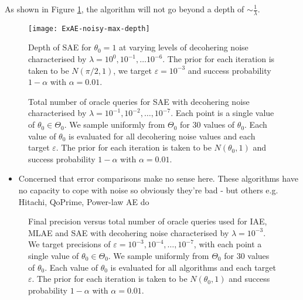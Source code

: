 As shown in Figure \ref{fig::ExAE-noisy-max-depth}, the algorithm will not go beyond a depth of $\sim \frac{1}{\lambda}$.

\begin{figure}[htbp]
	\centering
	\texttt{[image: ExAE-noisy-max-depth]}
	\caption{Depth of SAE for $\theta_0 = 1$ at varying levels of decohering noise characterised by $\lambda = 10^0, 10^{-1}, \ldots 10^{-6}$. The prior for each iteration is taken to be $N(\pi /2, 1)$, we target $\varepsilon = 10^{-3}$ and success probability $1 - \alpha$ with $\alpha = 0.01$.}
	\label{fig::ExAE-noisy-max-depth}
\end{figure}

\begin{figure}[htbp]
	\centering
	\missingfigure{}
	\caption{Total number of oracle queries for SAE with decohering noise characterised by $\lambda = 10^{-1}, 10^{-2}, \ldots, 10^{-7}$. Each point is a single value of $\theta_0 \in \Theta_0$. We sample uniformly from $\Theta_0$ for 30 values of $\theta_0$. Each value of $\theta_0$ is evaluated for all decohering noise values and each target $\varepsilon$. The prior for each iteration is taken to be $N(\theta_0, 1)$ and success probability $1 - \alpha$ with $\alpha = 0.01$.}
	\label{fig::query-exae-noisy}
\end{figure}

\begin{itemize}
	\color{red}
	\item Concerned that error comparisons make no sense here. These algorithms have no capacity to cope with noise so obviously they're bad - but others e.g. Hitachi, QoPrime, Power-law AE do
\end{itemize}

\begin{figure}[htbp]
	\centering
	\missingfigure{}
	\caption{Final precision versus total number of oracle queries used for IAE, MLAE and SAE with decohering noise characterised by $\lambda = 10^{-3}$. We target precisions of $\varepsilon = 10^{-3}, 10^{-4}, \ldots , 10^{-7}$, with each point a single value of $\theta_0 \in \Theta_0$. We sample uniformly from $\Theta_0$ for 30 values of $\theta_0$. Each value of $\theta_0$ is evaluated for all algorithms and each target $\varepsilon$. The prior for each iteration is taken to be $N(\theta_0, 1)$ and success probability $1 - \alpha$ with $\alpha = 0.01$.}
	\label{fig::query-comparison-noisy}
\end{figure}

\newpage



